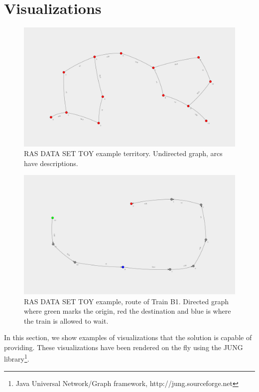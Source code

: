 \documentclass[10pt,a4paper,draft]{article}
\begin{document}
\section{Visualizations}

\begin{figure}
\centering
\includegraphics[width=150mm,angle=90]{solution.png}
\caption{RAS DATA SET TOY example territory. Undirected graph, arcs have descriptions.}
\end{figure}

\begin{figure}
\includegraphics[width=150mm,angle=90]{B1.png}
\centering
\caption{RAS DATA SET TOY example, route of Train B1. Directed graph where green marks the origin, red the destination and blue is where the train is allowed to wait.}
\end{figure}

In this section, we show examples of visualizations that the solution is capable of providing. These visualizations have been rendered on the fly using the JUNG library\footnote{Java Universal Network/Graph framework, http://jung.sourceforge.net}.
\end{document}
